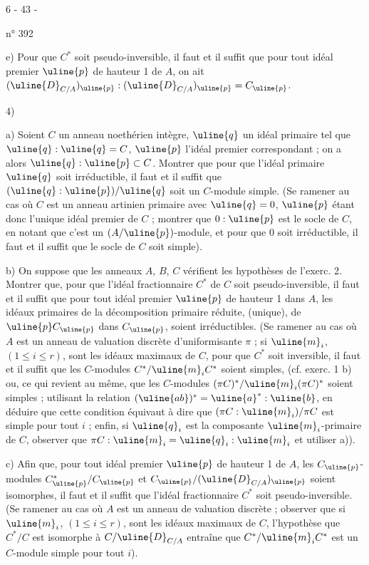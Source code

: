 \begin{center}6 - 43 -\end{center}
\hfill n° 392

e) Pour que $C^*$ soit pseudo-inversible, il faut et il suffit que pour tout idéal premier $\uline{p}$ de hauteur 1 de $A$, on ait $(\uline{D}_{C/A})_{\uline{p}}:(\uline{D}_{C/A})_{\uline{p}}=C_{\uline{p}}$.

4)

a) Soient $C$ un anneau noethérien intègre, $\uline{q}$ un idéal primaire tel que $\uline{q}:\uline{q}=C$, $\uline{p}$ l'idéal premier correspondant ; on a alors $\uline{q}:\uline{p}\subset C$. Montrer que pour que l'idéal primaire $\uline{q}$ soit irréductible, il faut et il suffit que $(\uline{q}:\uline{p})/\uline{q}$ soit un $C$-module simple. (Se ramener au cas où $C$ est un anneau artinien primaire avec $\uline{q}=0$, $\uline{p}$ étant donc l'unique idéal premier de $C$ ; montrer que $0:\uline{p}$ est le socle de $C$, en notant que c'est un $(A/\uline{p})$-module, et pour que 0 soit irréductible, il faut et il suffit que le socle de $C$ soit simple).

b) On suppose que les anneaux $A$, $B$, $C$ vérifient les hypothèses de l'exerc. 2. Montrer que, pour que l'idéal fractionnaire $C^*$ de $C$ soit pseudo-inversible, il faut et il suffit que pour tout idéal premier $\uline{p}$ de hauteur 1 dans $A$, les idéaux primaires de la décomposition primaire réduite, (unique), de $\uline{p}C_{\uline{p}}$ dans $C_{\uline{p}}$, soient irréductibles. (Se ramener au cas où $A$ est un anneau de valuation discrète d'uniformisante $\pi$ ; si $\uline{m}_i$, $(1\leq i\leq r)$, sont les idéaux maximaux de $C$, pour que $C^*$ soit inversible, il faut et il suffit que les $C$-modules $C^*/\uline{m}_iC^*$ soient simples, (cf. exerc. 1 b) ou, ce qui revient au même, que les $C$-modules $(\pi C)^*/\uline{m}_i(\pi C)^*$ soient simples ; utilisant la relation $(\uline{ab})^*=\uline{a}^*:\uline{b}$, en déduire que cette condition équivaut à dire que $(\pi C:\uline{m}_i)/\pi C$ est simple pour tout $i$ ; enfin, si $\uline{q}_i$ est la composante $\uline{m}_i$-primaire de $C$, observer que $\pi C:\uline{m}_i=\uline{q}_i:\uline{m}_i$ et utiliser a)).

c) Afin que, pour tout idéal premier $\uline{p}$ de hauteur 1 de $A$, les $C_{\uline{p}}$-modules $C^*_{\uline{p}}/C_{\uline{p}}$ et $C_{\uline{p}}/(\uline{D}_{C/A})_{\uline{p}}$ soient isomorphes, il faut et il suffit que l'idéal fractionnaire $C^*$ soit pseudo-inversible. (Se ramener au cas où $A$ est un anneau de valuation discrète ; observer que si $\uline{m}_i$, $(1\leq i\leq r)$, sont les idéaux maximaux de $C$, l'hypothèse que $C^*/C$ est isomorphe à $C/\uline{D}_{C/A}$ entraîne que $C^*/\uline{m}_iC^*$ est un $C$-module simple pour tout $i$).

